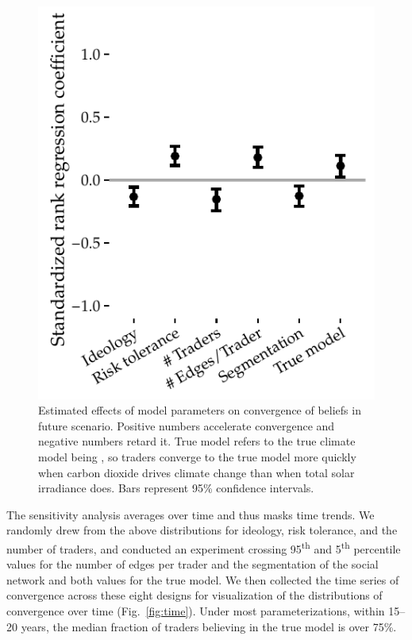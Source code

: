 \documentclass{wscpaperproc}\usepackage[]{graphicx}\usepackage[]{color}
\makeatletter
\def\maxwidth{ %
  \ifdim\Gin@nat@width>\linewidth
    \linewidth
  \else
    \Gin@nat@width
  \fi
}
\newenvironment{knitrout}{}{} %
\makeatother
\begin{document}
\begin{knitrout}
\color{fgcolor}\begin{figure}[t]

{\centering \includegraphics[width=\maxwidth]{figure/sa-1} 

}

\caption[Estimated effects of model parameters on convergence of beliefs in future scenario]{Estimated effects of model parameters on convergence of beliefs in future scenario. Positive numbers accelerate convergence and negative numbers retard it. True model refers to the true climate model being , so traders converge to the true model more quickly when carbon dioxide drives climate change than when total solar irradiance does. Bars represent 95\% confidence intervals.}\label{fig:sa}
\end{figure}


\end{knitrout}

The sensitivity analysis averages over time and thus masks time trends. We randomly drew from the above distributions for ideology, risk tolerance, and the number of traders, and conducted an experiment crossing 95\textsuperscript{th} and 5\textsuperscript{th} percentile values for the number of edges per trader and the segmentation of the social network and both values for the true model. We then collected the time series of convergence across these eight designs for visualization of the distributions of convergence over time (Fig.~\ref{fig:time}). Under most parameterizations, within 15--20 years, the median fraction of traders believing in the true model is over 75\%.
\end{document}

